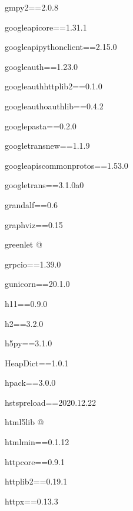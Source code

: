 \documentclass[letterpaper,10pt,english]{sphinxmanual}
\begin{document}
\sphinxAtStartPar
gmpy2==2.0.8

\sphinxAtStartPar
google\sphinxhyphen{}api\sphinxhyphen{}core==1.31.1

\sphinxAtStartPar
google\sphinxhyphen{}api\sphinxhyphen{}python\sphinxhyphen{}client==2.15.0

\sphinxAtStartPar
google\sphinxhyphen{}auth==1.23.0

\sphinxAtStartPar
google\sphinxhyphen{}auth\sphinxhyphen{}httplib2==0.1.0

\sphinxAtStartPar
google\sphinxhyphen{}auth\sphinxhyphen{}oauthlib==0.4.2

\sphinxAtStartPar
google\sphinxhyphen{}pasta==0.2.0

\sphinxAtStartPar
google\sphinxhyphen{}trans\sphinxhyphen{}new==1.1.9

\sphinxAtStartPar
googleapis\sphinxhyphen{}common\sphinxhyphen{}protos==1.53.0

\sphinxAtStartPar
googletrans==3.1.0a0

\sphinxAtStartPar
grandalf==0.6

\sphinxAtStartPar
graphviz==0.15

\sphinxAtStartPar
greenlet @ 

\sphinxAtStartPar
grpcio==1.39.0

\sphinxAtStartPar
gunicorn==20.1.0

\sphinxAtStartPar
h11==0.9.0

\sphinxAtStartPar
h2==3.2.0

\sphinxAtStartPar
h5py==3.1.0

\sphinxAtStartPar
HeapDict==1.0.1

\sphinxAtStartPar
hpack==3.0.0

\sphinxAtStartPar
hstspreload==2020.12.22

\sphinxAtStartPar
html5lib @ 

\sphinxAtStartPar
htmlmin==0.1.12

\sphinxAtStartPar
httpcore==0.9.1

\sphinxAtStartPar
httplib2==0.19.1

\sphinxAtStartPar
httpx==0.13.3
\end{document}
